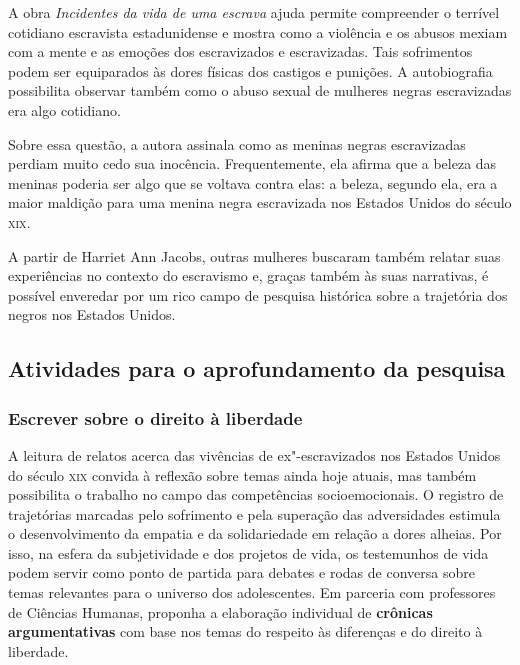 \documentclass[11pt]{extarticle}
\begin{document}
A obra \emph{Incidentes da vida de uma escrava} ajuda permite
compreender o terrível cotidiano escravista estadunidense e mostra como
a violência e os abusos mexiam com a mente e as emoções dos escravizados
e escravizadas. Tais sofrimentos podem ser equiparados às dores físicas
dos castigos e punições. A autobiografia possibilita observar também
como o abuso sexual de mulheres negras escravizadas era algo cotidiano.

Sobre essa questão, a autora assinala como as meninas negras
escravizadas perdiam muito cedo sua inocência. Frequentemente, ela
afirma que a beleza das meninas poderia ser algo que se voltava contra
elas: a beleza, segundo ela, era a maior maldição para uma menina negra
escravizada nos Estados Unidos do século \textsc{xix}.

A partir de Harriet Ann Jacobs, outras mulheres buscaram também relatar
suas experiências no contexto do escravismo e, graças também às suas
narrativas, é possível enveredar por um rico campo de pesquisa histórica
sobre a trajetória dos negros nos Estados Unidos.

\subsection{Atividades para o aprofundamento da pesquisa}


\subsubsection{Escrever sobre o direito à liberdade}

A leitura de relatos acerca das vivências de ex"-escravizados nos
Estados Unidos do século \textsc{xix} convida à reflexão sobre temas ainda hoje
atuais, mas também possibilita o trabalho no campo das competências
socioemocionais. O registro de trajetórias marcadas pelo sofrimento e
pela superação das adversidades estimula o desenvolvimento da empatia
e da solidariedade em relação a dores alheias. Por isso, na esfera da
subjetividade e dos projetos de vida, os testemunhos de vida podem
servir como ponto de partida para debates e rodas de conversa sobre
temas relevantes para o universo dos adolescentes. Em parceria com
professores de Ciências Humanas, proponha a elaboração individual de
\textbf{crônicas argumentativas} com base nos temas do respeito às
diferenças e do direito à liberdade. 
\end{document}
